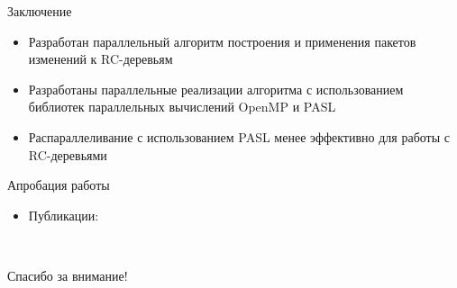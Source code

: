\documentclass[hyperref=unicode,graphics=pdflatex,13pt]{beamer}
\begin{document}
\begin{frame}[shrink]{Заключение}
\begin{itemize}
    \item Разработан параллельный алгоритм построения и применения пакетов изменений к RC-деревьям
    \item Разработаны параллельные реализации алгоритма с использованием библиотек параллельных вычислений OpenMP и PASL
    \item Распараллеливание с использованием PASL менее эффективно для работы с RC-деревьями
\end{itemize}

\end{frame}

\begin{frame}[shrink]{Апробация работы}
\begin{itemize}
\item Публикации:\nocite{wjf-kmu, wjf-spisok}
\printbibliography 
\end{itemize}
\end{frame}
\begin{frame}[shrink]{~~~}
\begin{center}
\Huge Спасибо за внимание!
\end{center}
\end{frame}
\end{document}
